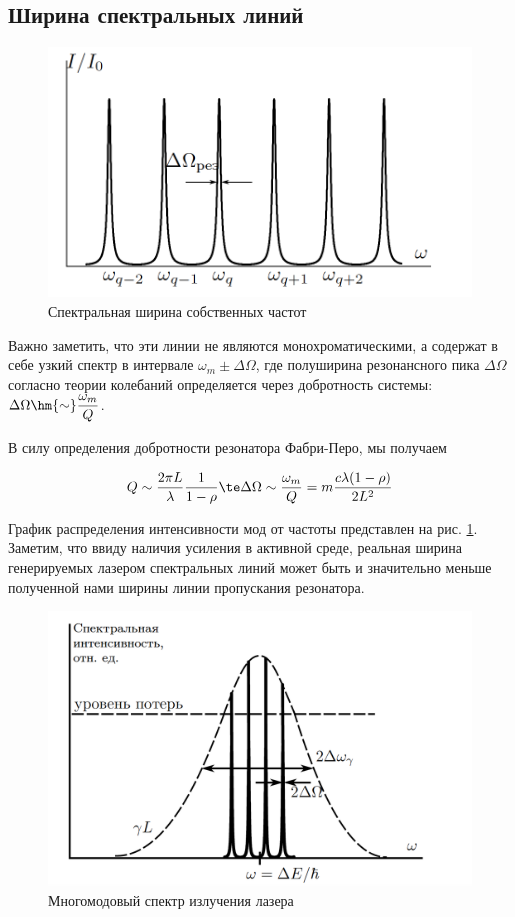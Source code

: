 \documentclass[12pt]{kiarticle}
\begin{document}
\subsection{Ширина спектральных линий}

\begin{figure} 
	\includegraphics[width=\linewidth]{piks.png}
	\caption{Спектральная ширина собственных частот}
	\label{piks}
\end{figure}

Важно заметить, что эти линии не являются монохроматическими, а содержат в себе узкий спектр в интервале $ \omega_m \pm \Delta \Omega $, где полуширина резонансного пика $ \Delta \Omega $ согласно теории колебаний определяется через добротность системы: $ \Delta \Omega \hm{\sim} \dfrac{\omega_m}{Q} $. 

В силу определения добротности резонатора Фабри-Перо, мы получаем 

\begin{equation}\label{Q}
Q \sim \dfrac{2\pi L}{\lambda} \dfrac{1}{1 - \rho} \te \Delta \Omega \sim \dfrac{\omega_m}{Q} = m \dfrac{c \lambda (1- \rho)}{2 L^2}
\end{equation}

График распределения интенсивности мод от частоты представлен на рис. \ref{piks}. Заметим, что ввиду наличия усиления в активной среде, реальная ширина генерируемых лазером спектральных линий может быть
и значительно меньше полученной нами ширины линии пропускания резонатора. 

\begin{figure}[h!]
	\centering
	\includegraphics[width=0.7\linewidth]{mods.png}
	\caption{Многомодовый спектр излучения лазера}
	\label{mods}
\end{figure}
\end{document}
